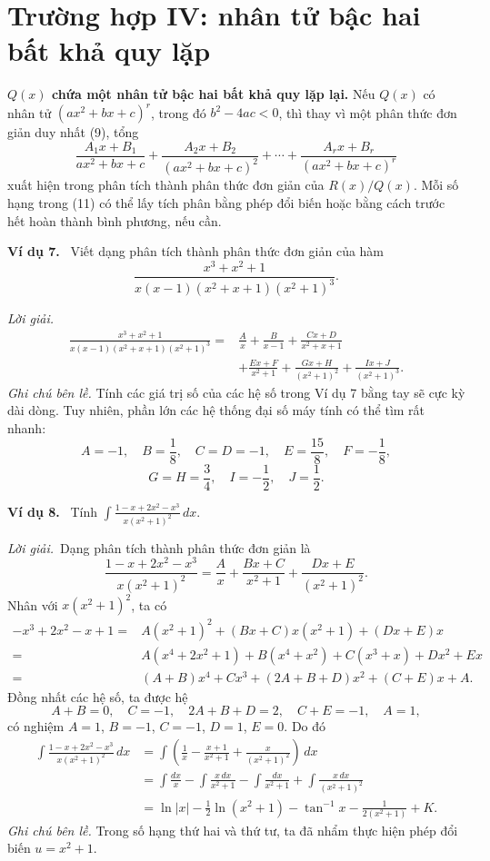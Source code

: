 \documentclass[12pt,a4paper]{article}
\newcommand{\ex}[1]{\par\medskip\noindent\textbf{Ví dụ #1.}\ }
\newcommand{\sol}{\par\nopagebreak[4]\noindent\textit{Lời giải.}\ }
\begin{document}
\section*{Trường hợp IV: nhân tử bậc hai bất khả quy lặp}
\textbf{$Q(x)$ chứa một nhân tử bậc hai bất khả quy lặp lại.} Nếu $Q(x)$ có nhân tử $(ax^2+bx+c)^r$, trong đó $b^2-4ac<0$, thì thay vì một phân thức đơn giản duy nhất (9), tổng
\begin{equation}\frac{A_1x+B_1}{ax^2+bx+c}+\frac{A_2x+B_2}{(ax^2+bx+c)^2}+\cdots+\frac{A_rx+B_r}{(ax^2+bx+c)^r}\tag{11}\end{equation}
xuất hiện trong phân tích thành phân thức đơn giản của $R(x)/Q(x)$. Mỗi số hạng trong (11) có thể lấy tích phân bằng phép đổi biến hoặc bằng cách trước hết hoàn thành bình phương, nếu cần.

\ex{7} Viết dạng phân tích thành phân thức đơn giản của hàm
\[\frac{x^3+x^2+1}{x(x-1)(x^2+x+1)(x^2+1)^3}.\]
\sol
\begin{align*}
\frac{x^3+x^2+1}{x(x-1)(x^2+x+1)(x^2+1)^3}
={}&\frac Ax+\frac B{x-1}+\frac{Cx+D}{x^2+x+1}\\
&+\frac{Ex+F}{x^2+1}+\frac{Gx+H}{(x^2+1)^2}+\frac{Ix+J}{(x^2+1)^3}.
\end{align*}
\textit{Ghi chú bên lề.} Tính các giá trị số của các hệ số trong Ví dụ 7 bằng tay sẽ cực kỳ dài dòng. Tuy nhiên, phần lớn các hệ thống đại số máy tính có thể tìm rất nhanh:
\[A=-1,\quad B=\frac18,\quad C=D=-1,\quad E=\frac{15}8,\quad F=-\frac18,\]
\[G=H=\frac34,\quad I=-\frac12,\quad J=\frac12.\]

\ex{8} Tính $\displaystyle\int\frac{1-x+2x^2-x^3}{x(x^2+1)^2}\,dx$.
\sol Dạng phân tích thành phân thức đơn giản là
\[\frac{1-x+2x^2-x^3}{x(x^2+1)^2}=\frac Ax+\frac{Bx+C}{x^2+1}+\frac{Dx+E}{(x^2+1)^2}.\]
Nhân với $x(x^2+1)^2$, ta có
\begin{align*}
-x^3+2x^2-x+1={}&A(x^2+1)^2+(Bx+C)x(x^2+1)+(Dx+E)x\\
={}&A(x^4+2x^2+1)+B(x^4+x^2)+C(x^3+x)+Dx^2+Ex\\
={}&(A+B)x^4+Cx^3+(2A+B+D)x^2+(C+E)x+A.
\end{align*}
Đồng nhất các hệ số, ta được hệ
\[A+B=0,\quad C=-1,\quad2A+B+D=2,\quad C+E=-1,\quad A=1,\]
có nghiệm $A=1$, $B=-1$, $C=-1$, $D=1$, $E=0$. Do đó
\begin{align*}
\int\frac{1-x+2x^2-x^3}{x(x^2+1)^2}\,dx
&=\int\left(\frac1x-\frac{x+1}{x^2+1}+\frac{x}{(x^2+1)^2}\right)\,dx\\
&=\int\frac{dx}{x}-\int\frac{x\,dx}{x^2+1}-\int\frac{dx}{x^2+1}+\int\frac{x\,dx}{(x^2+1)^2}\\
&=\ln|x|-\frac12\ln(x^2+1)-\tan^{-1}x-\frac1{2(x^2+1)}+K.
\end{align*}
\textit{Ghi chú bên lề.} Trong số hạng thứ hai và thứ tư, ta đã nhẩm thực hiện phép đổi biến $u=x^2+1$.
\end{document}
